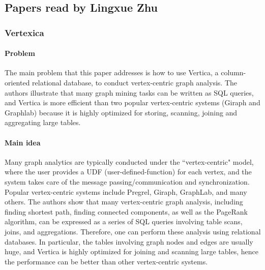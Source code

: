 
\subsection{Papers read by Lingxue Zhu}

\subsubsection{Vertexica \cite{jindal2015graph} }

\paragraph{Problem} The main problem that this paper addresses is how to use Vertica, a column-oriented relational database, to conduct vertex-centric graph analysis. The authors illustrate that many graph mining tasks can be written as SQL queries, and Vertica is more efficient than two popular vertex-centric systems (Giraph and Graphlab) because it is highly optimized for storing, scanning, joining and aggregating large tables. 


\paragraph{Main idea} 
Many graph analytics are typically conducted under the ``vertex-centric" model, where the user provides a UDF (user-defined-function) for each vertex, and the system takes care of the message passing/communication and synchronization. Popular vertex-centric systems include Pregrel, Giraph, GraphLab, and many others. The authors show that many vertex-centric graph analysis, including finding shortest path, finding connected components, as well as the PageRank algorithm, can be expressed as a series of SQL queries involving table scans, joins, and aggregations. Therefore, one can perform these analysis using relational databases. In particular, the tables involving graph nodes and edges are usually huge, and Vertica is highly optimized for joining and scanning large tables, hence the performance can be better than other vertex-centric systems.

